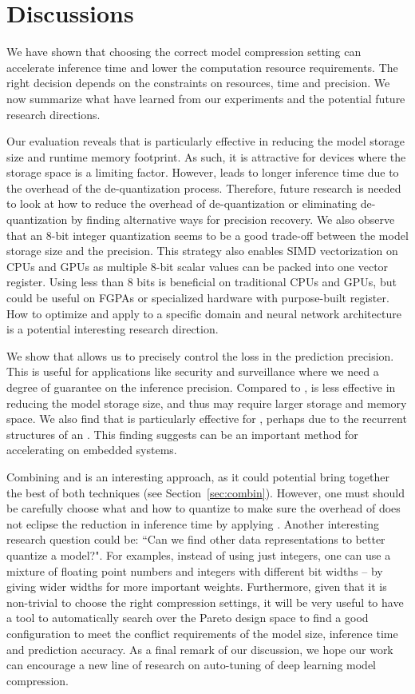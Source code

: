 \section{Discussions}
We have shown that choosing the correct model compression setting can accelerate inference time and lower the computation resource
requirements. The right decision depends on the constraints on resources, time and precision. We now summarize what have learned from our
experiments and the potential future research directions.

Our evaluation reveals that \dquantization is particularly effective in reducing the model storage size and runtime memory footprint. As
such, it is attractive for devices where the storage space is a limiting factor. However, \quantization leads to longer inference time due
to the overhead of the de-quantization process. Therefore, future research is needed to look at how to reduce the overhead of
de-quantization or eliminating de-quantization by finding alternative ways for precision recovery. We also observe that an 8-bit integer
quantization seems to be a good trade-off between the model storage size and the precision. This strategy also enables SIMD vectorization
on CPUs and GPUs as multiple 8-bit scalar values can be packed into one vector register. Using less than 8 bits is beneficial on
traditional CPUs and GPUs, but could be useful on FGPAs or specialized hardware with purpose-built register. How to optimize and apply
\dquantization to a specific domain and neural network architecture is a potential interesting research direction.

We show that \pruning allows us to precisely control the loss in the prediction precision. This is useful for applications like security
and surveillance where we need a degree of guarantee on the inference precision. Compared to \dquantization, \pruning is less effective in
reducing the model storage size, and thus may require larger storage and memory space. We also find that \pruning is particularly effective
for \RNNs, perhaps due to the recurrent structures of an \RNN. This finding suggests \pruning can be an important method for accelerating
\RNN on embedded systems.

Combining \dquantization and \pruning is an interesting approach, as it could potential bring together the best of both techniques (see
Section~\ref{sec:combin}). However, one must should be carefully choose what and how to quantize to make sure the overhead of
\dquantization does not eclipse the reduction in inference time by applying \pruning. Another interesting research question could be: ``Can
we find other data representations to better quantize a model?". For examples, instead of using just integers, one can use a mixture of
floating point numbers and integers with different bit widths – by giving wider widths for more important weights. Furthermore, given that
it is non-trivial to choose the right compression settings, it will be very useful to have a tool to automatically search over the Pareto
design space to find a good configuration to meet the conflict requirements of the model size, inference time and prediction accuracy.  As
a final remark of our discussion, we hope our work can encourage a new line of research on auto-tuning of deep learning model compression.
